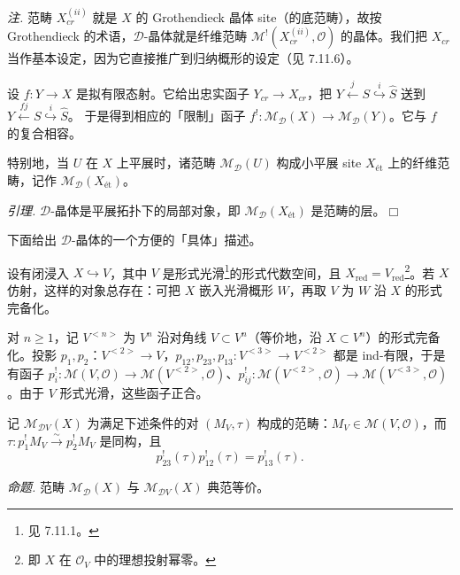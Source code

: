 \emph{注.} 范畴 $X_{cr}^{(ii)}$ 就是 $X$ 的 Grothendieck 晶体 site（的底范畴），故按 Grothendieck 的术语，$\mathcal{D}$-晶体就是纤维范畴 $\mathcal{M}^{!}(X_{cr}^{(ii)},\mathcal{O})$ 的晶体。我们把 $X_{cr}$ 当作基本设定，因为它直接推广到归纳概形的设定（见 7.11.6）。

 设 $f:Y\to X$ 是拟有限态射。它给出忠实函子 $Y_{cr}\to X_{cr}$，把 $Y\overset{j}{\longleftarrow}S\overset{i}{\hookrightarrow}\hat S$ 送到 $Y\overset{fj}{\longleftarrow}S\overset{i}{\hookrightarrow}\hat S$。%
于是得到相应的「限制」函子 $f^{!}:\mathcal{M}_{\mathcal{D}}(X)\to\mathcal{M}_{\mathcal{D}}(Y)$。它与 $f$ 的复合相容。

特别地，当 $U$ 在 $X$ 上平展时，诸范畴 $\mathcal{M}_{\mathcal{D}}(U)$ 构成小平展 site $X_{\text{ét}}$ 上的纤维范畴，记作 $\mathcal{M}_{\mathcal{D}}(X_{\text{ét}})$。

 \emph{引理.} $\mathcal{D}$-晶体是平展拓扑下的局部对象，即 $\mathcal{M}_{\mathcal{D}}(X_{\text{ét}})$ 是范畴的层。\hfill$\Box$

 下面给出 $\mathcal{D}$-晶体的一个方便的「具体」描述。

设有闭浸入 $X\hookrightarrow V$，其中 $V$ 是形式光滑\footnote{见 7.11.1。}的形式代数空间，且 $X_{\mathrm{red}}=V_{\mathrm{red}}$\footnote{即 $X$ 在 $\mathcal{O}_{V}$ 中的理想投射幂零。}。若 $X$ 仿射，这样的对象总存在：可把 $X$ 嵌入光滑概形 $W$，再取 $V$ 为 $W$ 沿 $X$ 的形式完备化。

对 $n\geq1$，记 $V^{<n>}$ 为 $V^{n}$ 沿对角线 $V\subset V^{n}$（等价地，沿 $X\subset V^{n}$）的形式完备化。投影 $p_{1},p_{2}$：$V^{<2>}\to V$，$p_{12},p_{23},p_{13}:V^{<3>}\to V^{<2>}$ 都是 ind-有限，于是有函子 $p^{!}_{i}:\mathcal{M}(V,\mathcal{O})\to\mathcal{M}(V^{<2>},\mathcal{O})$、$p^{!}_{ij}:\mathcal{M}(V^{<2>},\mathcal{O})\to\mathcal{M}(V^{<3>},\mathcal{O})$。由于 $V$ 形式光滑，这些函子正合。

记 $\mathcal{M}_{\mathcal{D}V}(X)$ 为满足下述条件的对 $(M_{V},\tau)$ 构成的范畴：$M_{V}\in\mathcal{M}(V,\mathcal{O})$，而 $\tau:p^{!}_{1}M_{V}\xrightarrow{\sim}p^{!}_{2}M_{V}$ 是同构，且
\begin{equation}\tag{340}
p^{!}_{23}(\tau)p^{!}_{12}(\tau)=p^{!}_{13}(\tau).
\end{equation}

 \emph{命题.} 范畴 $\mathcal{M}_{\mathcal{D}}(X)$ 与 $\mathcal{M}_{\mathcal{D}V}(X)$ 典范等价。

